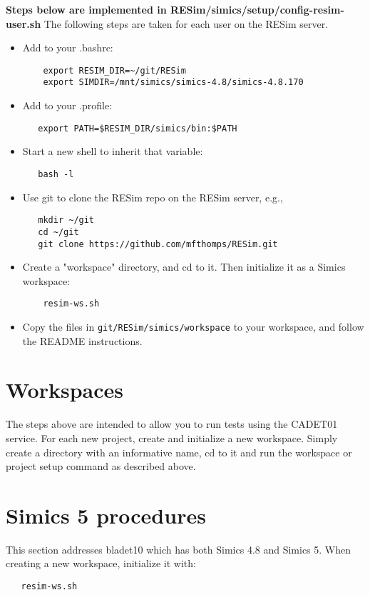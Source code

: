 \documentclass[titlepage]{article}
\begin{document}
\textbf{Steps below are implemented in RESim/simics/setup/config-resim-user.sh}
The following steps are taken for each user on the RESim server.
\begin{itemize}

\item Add to your .bashrc:
\begin{verbatim}
    export RESIM_DIR=~/git/RESim
    export SIMDIR=/mnt/simics/simics-4.8/simics-4.8.170
\end{verbatim}
\item Add to your .profile:
\begin{verbatim}
   export PATH=$RESIM_DIR/simics/bin:$PATH
\end{verbatim}

\item Start a new shell to inherit that variable:
\begin{verbatim}
   bash -l
\end{verbatim}

\item Use git to clone the RESim repo on the RESim server, e.g., 
\begin{verbatim}
   mkdir ~/git
   cd ~/git
   git clone https://github.com/mfthomps/RESim.git
\end{verbatim}

\item Create a "workspace" directory, and cd to it.  Then initialize
it as a Simics workspace:
\begin{verbatim}
    resim-ws.sh
\end{verbatim}

\item Copy the files in {\tt git/RESim/simics/workspace} to your workspace, and follow the README instructions.
\end{itemize}

\section{Workspaces}
The steps above are intended to allow you to run tests using the CADET01 service. 
For each new project, create and initialize a new workspace.  Simply create a directory
with an informative name, cd to it and run the workspace or project setup command as described above.

\section{Simics 5 procedures}
This section addresses bladet10 which has both Simics 4.8 and Simics 5.
When creating a new workspace, initialize it with:
\begin{verbatim}
   resim-ws.sh
\end{verbatim}
\end{document}
